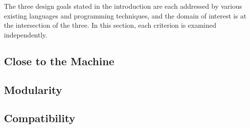 The three design goals stated in the introduction are each addressed by various existing languages and programming techniques, and the domain of interest is at the intersection of the three.  In this section, each criterion is examined independently.

\subsection{Close to the Machine}



\subsection{Modularity}



\subsection{Compatibility}


